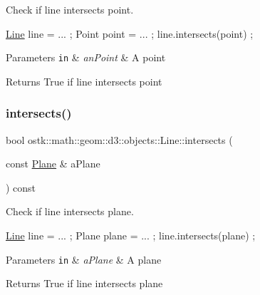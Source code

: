 Check if line intersects point. 


\begin{DoxyCode}
\hyperlink{classostk_1_1math_1_1geom_1_1d3_1_1objects_1_1_line_a9ebdaaf67a4bd91780808f8683463ebe}{Line} line = ... ;
Point point = ... ;
line.intersects(point) ;
\end{DoxyCode}



\begin{DoxyParams}[1]{Parameters}
\mbox{\tt in}  & {\em an\+Point} & A point \\
\hline
\end{DoxyParams}
\begin{DoxyReturn}{Returns}
True if line intersects point 
\end{DoxyReturn}
\mbox{\label{classostk_1_1math_1_1geom_1_1d3_1_1objects_1_1_line_a292e86df1d673e4f040691b25877a6ce}} 
\subsubsection{\texorpdfstring{intersects()}{intersects()}\hspace{0.1cm}{\footnotesize\ttfamily [2/4]}}
{\footnotesize\ttfamily bool ostk\+::math\+::geom\+::d3\+::objects\+::\+Line\+::intersects (\begin{DoxyParamCaption}\item[{const \hyperlink{classostk_1_1math_1_1geom_1_1d3_1_1objects_1_1_plane}{Plane} \&}]{a\+Plane }\end{DoxyParamCaption}) const}



Check if line intersects plane. 


\begin{DoxyCode}
\hyperlink{classostk_1_1math_1_1geom_1_1d3_1_1objects_1_1_line_a9ebdaaf67a4bd91780808f8683463ebe}{Line} line = ... ;
Plane plane = ... ;
line.intersects(plane) ;
\end{DoxyCode}



\begin{DoxyParams}[1]{Parameters}
\mbox{\tt in}  & {\em a\+Plane} & A plane \\
\hline
\end{DoxyParams}
\begin{DoxyReturn}{Returns}
True if line intersects plane 
\end{DoxyReturn}
\mbox{\label{classostk_1_1math_1_1geom_1_1d3_1_1objects_1_1_line_a5300ab7d6cbe87cf74de014252956558}} 
